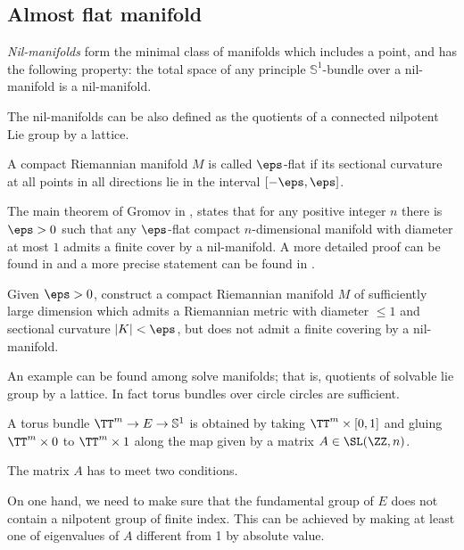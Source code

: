 \subsection*{Almost flat manifold\easy}
\label{almost-flat}

\emph{Nil-manifolds} form the minimal class of manifolds which includes a point, and has the following property:  
the total space of any principle $\mathbb{S}^1$-bundle over a nil-manifold is a nil-manifold. 

The nil-manifolds can be also defined as the quotients of a connected nilpotent Lie group by a lattice.

A compact Riemannian manifold $M$ is called $\eps$-flat if its sectional curvature at all points in all directions lie in the interval $[-\eps,\eps]$. 

The main theorem of Gromov in \cite{gromov-almost-flat}, 
states that for any positive integer $n$ there is $\eps>0$ such that any $\eps$-flat compact $n$-dimensional manifold with diameter at most $1$ admits a finite cover by a nil-manifold.
A more detailed proof can be found in \cite{buser-karcher}
and a more precise statement can be found in \cite{ruh}.

\begin{pr}
Given $\eps>0$, construct a compact Riemannian manifold $M$ of sufficiently large dimension which admits a Riemannian metric with diameter $\le 1$ and sectional
curvature $|K|<\eps$,
but does not admit a finite covering by a nil-manifold.
\end{pr}


An example can be found among solve manifolds;
that is, quotients of solvable lie group by a lattice.
In fact torus bundles over circle circles are sufficient.

\medskip

A torus bundle $\TT^m\to E\to\mathbb{S}^1$ is obtained by taking $\TT^m\times [0,1]$ and gluing $\TT^m\times 0$ to $\TT^m\times 1$ along the map given by a matrix $A\in \SL(\ZZ,n)$.

The matrix $A$ has to meet two conditions.

On one hand, we need to make sure that the fundamental group of $E$ does not contain a nilpotent group of finite index.
This can be achieved by making at least one of eigenvalues of $A$ different from 1 by absolute value.

